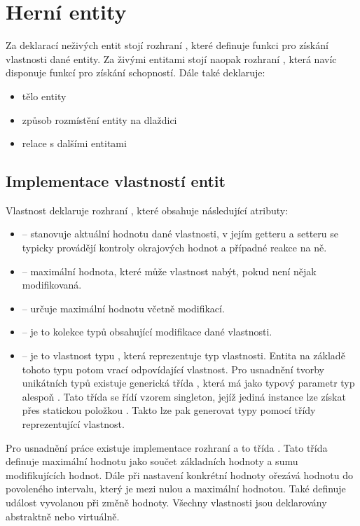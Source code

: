 \section{Herní entity}

Za deklarací neživých entit stojí rozhraní , které definuje funkci  pro získání vlastnosti dané entity.
Za živými entitami stojí naopak rozhraní , která navíc disponuje funkcí  pro získání schopností. Dále
také deklaruje:

\begin{itemize}
\item tělo entity
\item způsob rozmístění entity na dlaždici
\item relace s dalšími entitami
\end{itemize}

\subsection{Implementace vlastností entit}

Vlastnost deklaruje rozhraní , které obsahuje následující atributy:
\begin{itemize}
\item {} -- stanovuje aktuální hodnotu dané vlastnosti, v jejím getteru a setteru se typicky provádějí 
	kontroly okrajových hodnot a případné reakce na ně.
\item {} -- maximální hodnota, které může vlastnost nabýt, pokud není nějak modifikovaná.
\item {} -- určuje maximální hodnotu včetně modifikací. 
\item {} -- je to kolekce typů  obsahující modifikace dané vlastnosti.
\item {} -- je to vlastnost typu , která reprezentuje typ vlastnosti. Entita na základě 
	tohoto typu potom vrací odpovídající vlastnost. Pro usnadnění tvorby unikátních typů existuje generická třída , 
	která má jako typový parametr typ alespoň . Tato třída se řídí vzorem singleton, jejíž jediná instance 
	lze získat přes statickou položkou . Takto lze pak generovat typy pomocí třídy reprezentující vlastnost.
\end{itemize}

Pro usnadnění práce existuje implementace rozhraní  a to třída . Tato třída definuje 
maximální hodnotu jako součet základních hodnoty a sumu modifikujících hodnot. Dále při nastavení konkrétní hodnoty ořezává
hodnotu do povoleného intervalu, který je mezi nulou a maximální hodnotou. Také definuje událost vyvolanou při změně hodnoty.
Všechny vlastnosti jsou deklarovány abstraktně nebo virtuálně. 

